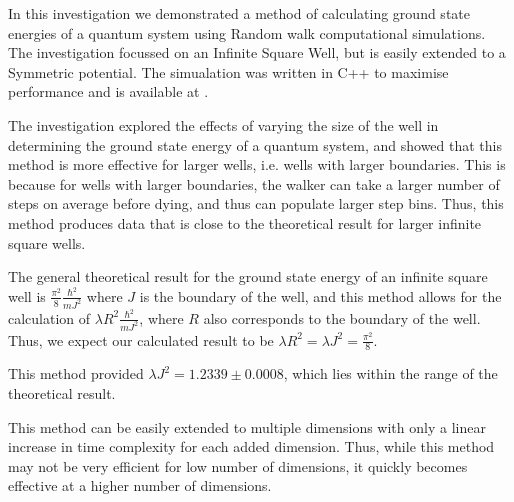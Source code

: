 \documentclass[journal]{IEEEtran}
\begin{document}
In this investigation we demonstrated a method of calculating ground state
energies of a quantum system using Random walk computational simulations. The
investigation focussed on an Infinite Square Well, but is easily extended to a
Symmetric potential. The simualation was written in C++ to maximise performance
and is available at .

The investigation explored the effects of varying the size of the well in
determining the ground state energy of a quantum system, and showed that this
method is more effective for larger wells, i.e. wells with larger
boundaries. This is because for wells with larger boundaries, the walker can
take a larger number of steps on average before dying, and thus can populate
larger step bins. Thus, this method produces data that is close to the
theoretical result for larger infinite square wells.

The general theoretical result for the ground state energy of an infinite square
well is $\frac{\pi^2}{8}\frac{\hbar^2}{mJ^2}$ where $J$ is the boundary of the
well, and this method allows for the calculation of $\lambda R^2
\frac{\hbar^2}{mJ^2}$, where $R$ also corresponds to the boundary of the
well. Thus, we expect our calculated result to be $\lambda R^2 = \lambda J^2 =
\frac{\pi^2}{8}$.

This method provided $\lambda J^2 = 1.2339 \pm 0.0008$, which lies within the
range of the theoretical result.

This method can be easily extended to multiple dimensions with only a linear
increase in time complexity for each added dimension. Thus, while this method
may not be very efficient for low number of dimensions, it quickly becomes
effective at a higher number of dimensions.




%
\end{document}
